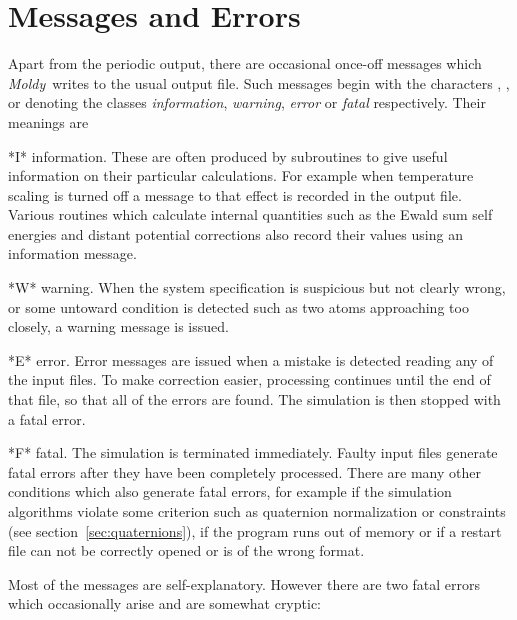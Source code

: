 \documentclass[a4paper,twoside]{report}
\newcommand{\moldy}{\emph{Moldy}}
\begin{document}
\section{Messages and Errors}%

Apart from the periodic output, there are occasional once-off
messages which \moldy\ writes to the usual output file.  Such messages
begin with the characters , ,  or
 denoting the classes \emph{information}, \emph{warning},
\emph{error} or \emph{fatal} respectively.  Their meanings are
\begin{Litdescription}
\item[*I*] information. These are often produced by subroutines
to give useful information on their particular calculations.  For
example when temperature scaling is turned off a message to that
effect is recorded in the output file.  Various routines which
calculate internal quantities such as the Ewald sum self energies and
distant potential corrections also record their values using an
information message.
\item[*W*] warning.  When the system specification is suspicious
but not clearly wrong, or some untoward condition is detected such as
two atoms approaching too closely, a warning message is issued.
\item[*E*] error. Error messages are issued when a mistake is
detected reading any of the input files. To make correction easier,
processing continues until the end of that file, so that all of the
errors are found.  The simulation is then stopped with a fatal error.
\item[*F*] fatal. The simulation is terminated immediately. Faulty 
input files generate fatal errors after they have been completely
processed.  There are many other conditions which also generate fatal
errors, for example if the simulation algorithms violate some
criterion such as quaternion normalization or constraints (see
section~\ref{sec:quaternions}), if the program runs out of memory or
if a restart file can not be correctly opened or is of the wrong
format.
\end{Litdescription}
Most of the messages are self-explanatory.  However there are two
fatal errors which occasionally arise and are somewhat cryptic:

\end{document}

